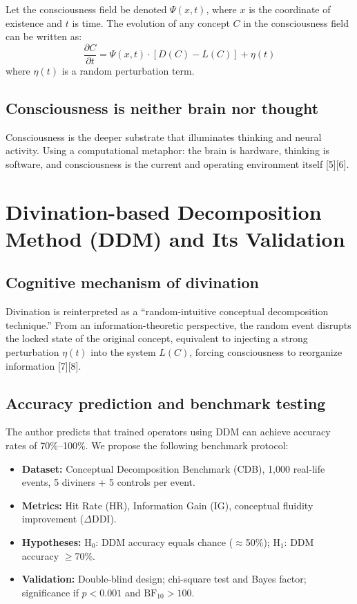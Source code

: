 \documentclass[11pt,a4paper]{article}
\begin{document}
Let the consciousness field be denoted $\Psi(x,t)$, where $x$ is the coordinate of existence and $t$ is time. The evolution of any concept $C$ in the consciousness field can be written as:
\begin{equation}
    \frac{\partial C}{\partial t} = \Psi(x,t) \cdot [D(C) - L(C)] + \eta(t)
    \label{eq:cupf}
\end{equation}
where $\eta(t)$ is a random perturbation term.

\subsection{Consciousness is neither brain nor thought}

Consciousness is the deeper substrate that illuminates thinking and neural activity. Using a computational metaphor: the brain is hardware, thinking is software, and consciousness is the current and operating environment itself [5][6].

\section{Divination-based Decomposition Method (DDM) and Its Validation}

\subsection{Cognitive mechanism of divination}

Divination is reinterpreted as a ``random-intuitive conceptual decomposition technique.'' From an information-theoretic perspective, the random event disrupts the locked state of the original concept, equivalent to injecting a strong perturbation $\eta(t)$ into the system $L(C)$, forcing consciousness to reorganize information [7][8].

\subsection{Accuracy prediction and benchmark testing}

The author predicts that trained operators using DDM can achieve accuracy rates of 70\%--100\%. We propose the following benchmark protocol:

\begin{itemize}
    \item \textbf{Dataset:} Conceptual Decomposition Benchmark (CDB), 1,000 real-life events, 5 diviners + 5 controls per event.
    \item \textbf{Metrics:} Hit Rate (HR), Information Gain (IG), conceptual fluidity improvement ($\Delta$DDI).
    \item \textbf{Hypotheses:} H$_0$: DDM accuracy equals chance ($\approx$50\%); H$_1$: DDM accuracy $\geq$70\%.
    \item \textbf{Validation:} Double-blind design; chi-square test and Bayes factor; significance if $p < 0.001$ and $\text{BF}_{10} > 100$.
\end{itemize}
\end{document}
